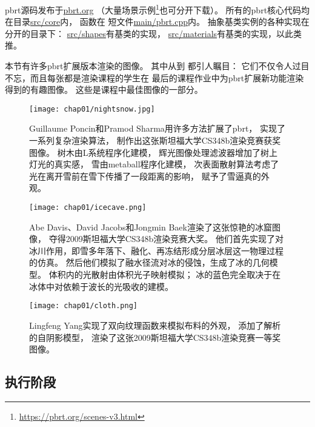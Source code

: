 pbrt源码发布于\href{https://pbrt.org/}{\ttfamily pbrt.org}
（大量场景示例\footnote{\url{https://pbrt.org/scenes-v3.html}}也可分开下载）。
所有的pbrt核心代码均在目录\href{https://github.com/mmp/pbrt-v3/tree/master/src/core}{\ttfamily src/core}内，
函数在
短文件\href{https://github.com/mmp/pbrt-v3/tree/master/src/main/pbrt.cpp}{\ttfamily main/pbrt.cpp}内。
抽象基类实例的各种实现在分开的目录下：
\href{https://github.com/mmp/pbrt-v3/tree/master/src/shapes}{\ttfamily src/shapes}有基类的实现，
\href{https://github.com/mmp/pbrt-v3/tree/master/src/materials}{\ttfamily src/materials}有基类的实现，以此类推。

本节有许多pbrt扩展版本渲染的图像。
其中从到
都引人瞩目：
它们不仅令人过目不忘，而且每张都是渲染课程的学生在
最后的课程作业中为pbrt扩展新功能渲染得到的有趣图像。
这些是课程中最佳图像的一部分。
\begin{figure}[htbp]
    \centering\texttt{[image: chap01/nightsnow.jpg]}
    \caption{Guillaume Poncin和Pramod Sharma用许多方法扩展了pbrt，
        实现了一系列复杂渲染算法，
        制作出这张斯坦福大学CS348b渲染竞赛获奖图像。
        树木由L系统程序化建模，
        辉光图像处理滤波器增加了树上灯光的真实感，
        雪由metaball程序化建模，
        次表面散射算法考虑了光在离开雪前在雪下传播了一段距离的影响，
        赋予了雪逼真的外观。}
    \label{fig:1.11}
\end{figure}
\begin{figure}[htbp]
    \centering\texttt{[image: chap01/icecave.png]}
    \caption{Abe Davis、David Jacobs和Jongmin Baek渲染了这张惊艳的冰窟图像，
        夺得2009斯坦福大学CS348b渲染竞赛大奖。
        他们首先实现了对冰川作用，即雪多年落下、融化、再冻结形成分层冰层这一物理过程的仿真。
        然后他们模拟了融水径流对冰的侵蚀，生成了冰的几何模型。
        体积内的光散射由体积光子映射模拟；
        冰的蓝色完全取决于在冰体中对依赖于波长的光吸收的建模。}
    \label{fig:1.12}
\end{figure}
\begin{figure}[htbp]
    \centering\texttt{[image: chap01/cloth.png]}
    \caption{Lingfeng Yang实现了双向纹理函数来模拟布料的外观，
        添加了解析的自阴影模型，
        渲染了这张2009斯坦福大学CS348b渲染竞赛一等奖图像。}
    \label{fig:1.13}
\end{figure}

\subsection{执行阶段}\label{sub:执行阶段}

